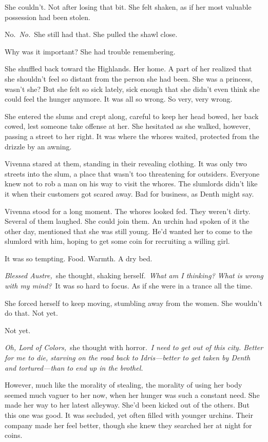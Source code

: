 She couldn’t. Not after losing that bit. She felt shaken, as if her most valuable possession had been stolen.

No.~\textit{No.}~She still had that. She pulled the shawl close.

Why was it important? She had trouble remembering.

She shuffled back toward the Highlands. Her home. A part of her realized that she shouldn’t feel so distant from the person she had been. She was a princess, wasn’t she? But she felt so sick lately, sick enough that she didn’t even think she could feel the hunger anymore. It was all so wrong. So very, very wrong.

She entered the slums and crept along, careful to keep her head bowed, her back cowed, lest someone take offense at her. She hesitated as she walked, however, passing a street to her right. It was where the whores waited, protected from the drizzle by an awning.

Vivenna stared at them, standing in their revealing clothing. It was only two streets into the slum, a place that wasn’t too threatening for outsiders. Everyone knew not to rob a man on his way to visit the whores. The slumlords didn’t like it when their customers got scared away. Bad for business, as Denth might say.

Vivenna stood for a long moment. The whores looked fed. They weren’t dirty. Several of them laughed. She could join them. An urchin had spoken of it the other day, mentioned that she was still young. He’d wanted her to come to the slumlord with him, hoping to get some coin for recruiting a willing girl.

It was so tempting. Food. Warmth. A dry bed.

\textit{Blessed Austre,}~she thought, shaking herself.~\textit{What am I thinking? What is wrong with my mind?}~It was so hard to focus. As if she were in a trance all the time.

She forced herself to keep moving, stumbling away from the women. She wouldn’t do that. Not yet.

Not yet.

\textit{Oh, Lord of Colors,}~she thought with horror.~\textit{I need to get out of this city. Better for me to die, starving on the road back to Idris—better to get taken by Denth and tortured—than to end up in the brothel.}

However, much like the morality of stealing, the morality of using her body seemed much vaguer to her now, when her hunger was such a constant need. She made her way to her latest alleyway. She’d been kicked out of the others. But this one was good. It was secluded, yet often filled with younger urchins. Their company made her feel better, though she knew they searched her at night for coins.

